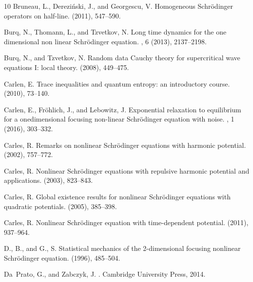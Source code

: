 \documentclass[%
11pt,  reqno]{amsart}
\theoremstyle{remarkstyle}
\newcommand{\1}{\hspace{0.2mm}\text{I}\hspace{0.2mm}}
\numberwithin{equation}{section}
\numberwithin{theorem}{section}
\begin{document}
\begin{thebibliography}{10}
		{\sc Bruneau, L., Derezi{\'n}ski, J., and Georgescu, V.}
		\newblock Homogeneous {S}chr{\"o}dinger operators on half-line.
		 (2011), 547--590.
		
		{\sc Burq, N., Thomann, L., and Tzvetkov, N.}
		\newblock Long time dynamics for the one dimensional non linear
		{S}chr{\"o}dinger equation.
		, 6 (2013), 2137--2198.
		
		{\sc Burq, N., and Tzvetkov, N.}
		\newblock Random data {C}auchy theory for supercritical wave equations {I:}
		local theory.
		 (2008), 449--475.
		
		{\sc Carlen, E.}
		\newblock Trace inequalities and quantum entropy: an introductory course.
		 (2010), 73--140.
		
		{\sc Carlen, E., Fr\"ohlich, J., and Lebowitz, J.}
		\newblock Exponential relaxation to equilibrium for a onedimensional focusing
		non-linear {S}chrödinger equation with noise.
		, 1 (2016), 303--332.
		
		{\sc Carles, R.}
		\newblock Remarks on nonlinear {S}chrödinger equations with harmonic
		potential.
		 (2002), 757--772.
		
		{\sc Carles, R.}
		\newblock Nonlinear {S}chrödinger equations with repulsive harmonic potential
		and applications.
		 (2003), 823--843.
		
		{\sc Carles, R.}
		\newblock Global existence results for nonlinear {S}chrödinger equations with
		quadratic potentials.
		 (2005), 385--398.
		
		{\sc Carles, R.}
		\newblock Nonlinear {S}chrödinger equation with time-dependent potential.
		 (2011), 937--964.
		
		{\sc D., B., and G., S.}
		\newblock Statistical mechanics of the 2-dimensional focusing nonlinear
		{S}chr\"odinger equation.
		 (1996), 485--504.
		
		{\sc Da~Prato, G., and Zabczyk, J.}
		.
		\newblock Cambridge University Press, 2014.
		

\end{thebibliography}
\end{document}
